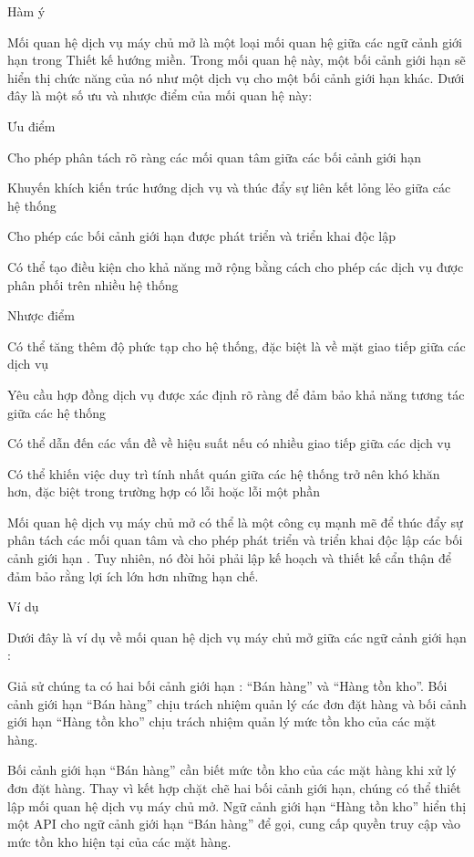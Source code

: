Hàm ý

Mối quan hệ dịch vụ máy chủ mở là một loại mối quan hệ giữa các ngữ cảnh giới hạn trong Thiết kế hướng miền. Trong mối quan hệ này, một bối cảnh giới hạn sẽ hiển thị chức năng của nó như một dịch vụ cho một bối cảnh giới hạn khác. Dưới đây là một số ưu và nhược điểm của mối quan hệ này:

Ưu điểm

Cho phép phân tách rõ ràng các mối quan tâm giữa các bối cảnh giới hạn

Khuyến khích kiến trúc hướng dịch vụ và thúc đẩy sự liên kết lỏng lẻo giữa các hệ thống

Cho phép các bối cảnh giới hạn được phát triển và triển khai độc lập

Có thể tạo điều kiện cho khả năng mở rộng bằng cách cho phép các dịch vụ được phân phối trên nhiều hệ thống

Nhược điểm

Có thể tăng thêm độ phức tạp cho hệ thống, đặc biệt là về mặt giao tiếp giữa các dịch vụ

Yêu cầu hợp đồng dịch vụ được xác định rõ ràng để đảm bảo khả năng tương tác giữa các hệ thống

Có thể dẫn đến các vấn đề về hiệu suất nếu có nhiều giao tiếp giữa các dịch vụ

Có thể khiến việc duy trì tính nhất quán giữa các hệ thống trở nên khó khăn hơn, đặc biệt trong trường hợp có lỗi hoặc lỗi một phần

Mối quan hệ dịch vụ máy chủ mở có thể là một công cụ mạnh mẽ để thúc đẩy sự phân tách các mối quan tâm và cho phép phát triển và triển khai độc lập các bối cảnh giới hạn . Tuy nhiên, nó đòi hỏi phải lập kế hoạch và thiết kế cẩn thận để đảm bảo rằng lợi ích lớn hơn những hạn chế.

Ví dụ

Dưới đây là ví dụ về mối quan hệ dịch vụ máy chủ mở giữa các ngữ cảnh giới hạn :

Giả sử chúng ta có hai bối cảnh giới hạn : “Bán hàng” và “Hàng tồn kho”. Bối cảnh giới hạn “Bán hàng” chịu trách nhiệm quản lý các đơn đặt hàng và bối cảnh giới hạn “Hàng tồn kho” chịu trách nhiệm quản lý mức tồn kho của các mặt hàng.

Bối cảnh giới hạn “Bán hàng” cần biết mức tồn kho của các mặt hàng khi xử lý đơn đặt hàng. Thay vì kết hợp chặt chẽ hai bối cảnh giới hạn, chúng có thể thiết lập mối quan hệ dịch vụ máy chủ mở. Ngữ cảnh giới hạn “Hàng tồn kho” hiển thị một API cho ngữ cảnh giới hạn “Bán hàng” để gọi, cung cấp quyền truy cập vào mức tồn kho hiện tại của các mặt hàng.

